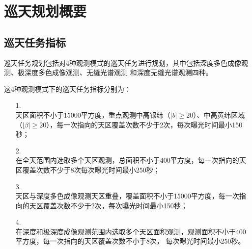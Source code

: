 
\chapter{巡天规划概要}


\section{巡天任务指标}

巡天任务规划包括对4种观测模式的巡天任务进行规划，其中包括深度多色成像观测、极深度多色成像观测、无缝光谱观测
和深度无缝光谱观测四种。

这4种观测模式下的巡天任务指标分别为：
\begin{itemize}
\item[1.] \\
天区面积不小于15000平方度，重点观测中高银纬（$|b|\ge 20$\textdegree）、中高黄纬区域
（$|\beta|\ge20$\textdegree），每一次指向的天区覆盖次数不少于2次，每次曝光时间最小150秒；
\item[2.] \\
在全天范围内选取多个天区观测，总面积不小于400平方度，每一次指向的天区覆盖次数不少于8次每次曝光时间最小250秒；
\item[3.] \\
天区与深度多色成像观测天区重叠，覆盖面积不小于15000平方度，每一次指向的天区覆盖次数不少于2次，每次曝光时间最小150秒；
\item[4.] \\
在深度和极深度成像观测范围内选取多个天区面积观测，观测面积不小于400平方度，每一次指向的天区覆盖次数不小于8次，
每次曝光时间最小250秒。
\end{itemize}





